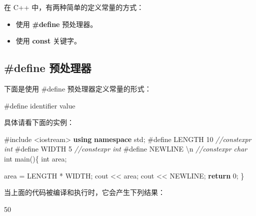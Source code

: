 \documentclass[
]{article}
\newenvironment{Shaded}{}{}
\newcommand{\CharTok}[1]{\textcolor[rgb]{0.25,0.44,0.63}{#1}}
\newcommand{\CommentTok}[1]{\textcolor[rgb]{0.38,0.63,0.69}{\textit{#1}}}
\newcommand{\ControlFlowTok}[1]{\textcolor[rgb]{0.00,0.44,0.13}{\textbf{#1}}}
\newcommand{\DataTypeTok}[1]{\textcolor[rgb]{0.56,0.13,0.00}{#1}}
\newcommand{\DecValTok}[1]{\textcolor[rgb]{0.25,0.63,0.44}{#1}}
\newcommand{\ImportTok}[1]{#1}
\newcommand{\KeywordTok}[1]{\textcolor[rgb]{0.00,0.44,0.13}{\textbf{#1}}}
\newcommand{\NormalTok}[1]{#1}
\newcommand{\OperatorTok}[1]{\textcolor[rgb]{0.40,0.40,0.40}{#1}}
\newcommand{\PreprocessorTok}[1]{\textcolor[rgb]{0.74,0.48,0.00}{#1}}
\newcommand{\SpecialCharTok}[1]{\textcolor[rgb]{0.25,0.44,0.63}{#1}}
\providecommand{\tightlist}{%
  \setlength{\itemsep}{0pt}\setlength{\parskip}{0pt}}
\begin{document}
在 C++ 中，有两种简单的定义常量的方式：

\begin{itemize}
\tightlist
\item
  使用 \textbf{\#define} 预处理器。
\item
  使用 \textbf{const} 关键字。
\end{itemize}

\hypertarget{define-ux9884ux5904ux7406ux5668}{%
\subsection{\#define 预处理器}\label{define-ux9884ux5904ux7406ux5668}}

下面是使用 \#define 预处理器定义常量的形式：

\begin{Shaded}
\begin{Highlighting}[]
\PreprocessorTok{\#define identifier }\NormalTok{value}
\end{Highlighting}
\end{Shaded}

具体请看下面的实例：

\begin{Shaded}
\begin{Highlighting}[]
\PreprocessorTok{\#include }\ImportTok{\textless{}iostream\textgreater{}}
\KeywordTok{using} \KeywordTok{namespace}\NormalTok{ std}\OperatorTok{;}
\PreprocessorTok{\#define LENGTH }\DecValTok{10}\PreprocessorTok{   }\CommentTok{//constexpr int }
\PreprocessorTok{\#define WIDTH  }\DecValTok{5}\PreprocessorTok{    }\CommentTok{//constexpr int}
\PreprocessorTok{\#define NEWLINE }\CharTok{\textquotesingle{}}\SpecialCharTok{\textbackslash{}n}\CharTok{\textquotesingle{}}\PreprocessorTok{ }\CommentTok{//constexpr char}
\DataTypeTok{int}\NormalTok{ main}\OperatorTok{()\{}
   \DataTypeTok{int}\NormalTok{ area}\OperatorTok{;}  
   
\NormalTok{   area }\OperatorTok{=}\NormalTok{ LENGTH }\OperatorTok{*}\NormalTok{ WIDTH}\OperatorTok{;}
\NormalTok{   cout }\OperatorTok{\textless{}\textless{}}\NormalTok{ area}\OperatorTok{;}
\NormalTok{   cout }\OperatorTok{\textless{}\textless{}}\NormalTok{ NEWLINE}\OperatorTok{;}
   \ControlFlowTok{return} \DecValTok{0}\OperatorTok{;}
\OperatorTok{\}}
\end{Highlighting}
\end{Shaded}

当上面的代码被编译和执行时，它会产生下列结果：

\begin{Shaded}
\begin{Highlighting}[]
\DecValTok{50}
\end{Highlighting}
\end{Shaded}
\end{document}
